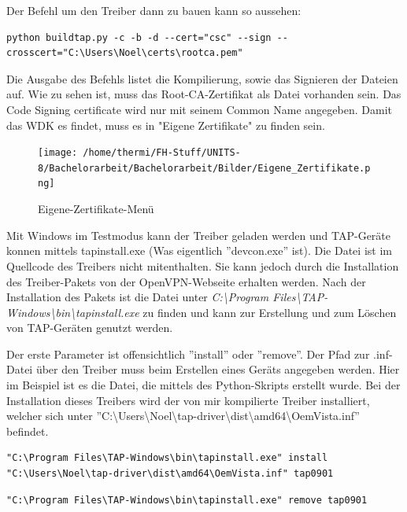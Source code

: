 Der Befehl um den Treiber dann zu bauen kann so aussehen:
\begin{lstlisting}[caption=TAP-Windows bauen]
python buildtap.py -c -b -d --cert="csc" --sign --crosscert="C:\Users\Noel\certs\rootca.pem"
\end{lstlisting}
Die Ausgabe des Befehls listet die Kompilierung, sowie das Signieren der Dateien auf.
Wie zu sehen ist, muss das Root-CA-Zertifikat als Datei vorhanden sein.
Das Code Signing certificate wird nur mit seinem Common Name angegeben.
Damit das WDK es findet, muss es in "Eigene Zertifikate" zu finden sein.
\begin{figure}
\texttt{[image: /home/thermi/FH-Stuff/UNITS-8/Bachelorarbeit/Bachelorarbeit/Bilder/Eigene\_Zertifikate.png]}
\caption{Eigene-Zertifikate-Menü}
\label{fig:Eigene-Zertifikate-Menue}
\end{figure}

Mit Windows im Testmodus kann der Treiber geladen werden und TAP-Geräte konnen
mittels tapinstall.exe (Was eigentlich ''devcon.exe'' ist). Die Datei ist im Quellcode des
Treibers nicht mitenthalten. Sie kann jedoch durch die Installation des Treiber-Pakets
von der OpenVPN-Webseite erhalten werden. Nach der Installation des Pakets
ist die Datei unter \textit{C:\textbackslash{}Program Files\textbackslash{}TAP-Windows\textbackslash{}bin\textbackslash{}tapinstall.exe}
zu finden und kann zur Erstellung und zum Löschen von TAP-Geräten genutzt werden.

Der erste Parameter ist offensichtlich ''install'' oder ''remove''. Der Pfad zur .inf-Datei
über den Treiber muss beim Erstellen eines Geräts angegeben werden. Hier im Beispiel
ist es die Datei, die mittels des Python-Skripts erstellt wurde. Bei der Installation
dieses Treibers wird der von mir kompilierte Treiber installiert, welcher sich unter 
''C:\textbackslash{}Users\textbackslash{}Noel\textbackslash{}tap-driver\textbackslash{}dist\textbackslash{}amd64\textbackslash{}OemVista.inf''
befindet.

\begin{lstlisting}[caption=Erstellung eines TAP-Geraets]
"C:\Program Files\TAP-Windows\bin\tapinstall.exe" install "C:\Users\Noel\tap-driver\dist\amd64\OemVista.inf" tap0901
\end{lstlisting}

\begin{lstlisting}[caption=Löschung aller TAP-Geraete]
"C:\Program Files\TAP-Windows\bin\tapinstall.exe" remove tap0901
\end{lstlisting}

